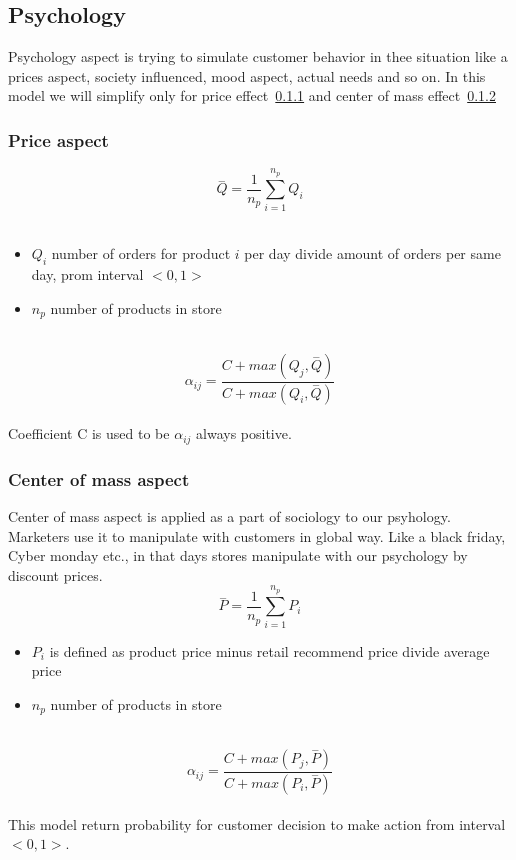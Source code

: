 \subsection{Psychology} \label{subsec:model_psychology}
Psychology aspect is trying to simulate customer behavior in thee situation like a prices aspect, society influenced, mood aspect, actual needs
and so on.
In this model we will simplify only for price effect~\ref{subsubsec:model_psychology_price} and center of mass effect~\ref{subsubsec:model_psychology_mass}
\subsubsection{Price aspect} \label{subsubsec:model_psychology_price}
\begin{equation} \label{eq:26}
\overset{-}{Q} = \frac{1}{n_p} \sum_{i=1}^{n_p} Q_i
\end{equation}
\\
\begin{itemize}
    \item $Q_i$ number of orders for product $i$ per day divide amount of orders per same day, prom interval $<0,1>$
    \item $n_p$ number of products in store
\end{itemize}
\\
\begin{equation} \label{eq:27}
\alpha_{ij} = \frac{C+max(Q_j, \overset{-}{Q})}{C+max(Q_i, \overset{-}{Q})}
\end{equation}
\\
Coefficient C is used to be $\alpha_{ij}$ always positive.
\subsubsection{Center of mass aspect} \label{subsubsec:model_psychology_mass}
Center of mass aspect is applied as a part of sociology to our psyhology.
Marketers use it to manipulate with customers in global way.
Like a black friday, Cyber monday etc., in that days stores manipulate with our psychology by discount prices.
\\
\begin{equation} \label{eq:28}
\overset{-}{P} = \frac{1}{n_p} \sum_{i=1}^{n_p} P_i
\end{equation}
\begin{itemize}
    \item $P_i$ is defined as product price minus retail recommend price divide average price
    \item $n_p$ number of products in store
\end{itemize}
\\
\begin{equation} \label{eq:29}
\alpha_{ij} = \frac{C+max(P_j, \overset{-}{P})}{C+max(P_i, \overset{-}{P})}
\end{equation}
\\
This model return probability for customer decision to make action from interval $<0,1>$.
\\
